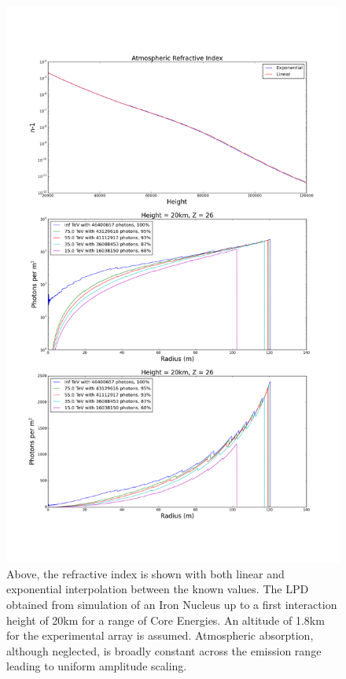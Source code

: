 \documentclass[11pt]{article}
\begin{document}
\begin{figure}
\begin{center}
\includegraphics[height=0.9\textheight]{simulatedlpd}
\caption{Above, the refractive index is shown with both linear and exponential interpolation between the known values. The LPD obtained from simulation of an Iron Nucleus up to a first interaction height of 20km for a range of Core Energies. An altitude of 1.8km for the experimental array is assumed. Atmospheric absorption, although neglected, is broadly constant across the emission range leading to uniform amplitude scaling.}
\label{fig:lpd}
\end{center}
\end{figure}
\end{document}
